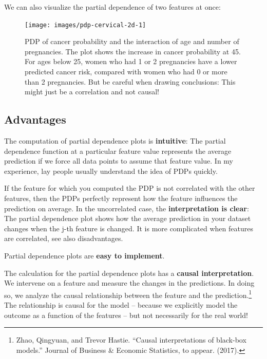 \documentclass[
  12pt,
]{krantz}
\begin{document}
We can also visualize the partial dependence of two features at once:

\begin{figure}

{\centering \texttt{[image: images/pdp-cervical-2d-1]} 

}

\caption{PDP of cancer probability and the interaction of age and number of pregnancies. The plot shows the increase in cancer probability at 45. For ages below 25, women who had 1 or 2 pregnancies have a lower predicted cancer risk, compared with women who had 0 or more than 2 pregnancies. But be careful when drawing conclusions: This might just be a correlation and not causal!}\label{fig:pdp-cervical-2d}
\end{figure}

\hypertarget{advantages-5}{%
\subsection{Advantages}\label{advantages-5}}

The computation of partial dependence plots is \textbf{intuitive}:
The partial dependence function at a particular feature value represents the average prediction if we force all data points to assume that feature value.
In my experience, lay people usually understand the idea of PDPs quickly.

If the feature for which you computed the PDP is not correlated with the other features, then the PDPs perfectly represent how the feature influences the prediction on average.
In the uncorrelated case, the \textbf{interpretation is clear}:
The partial dependence plot shows how the average prediction in your dataset changes when the j-th feature is changed.
It is more complicated when features are correlated, see also disadvantages.

Partial dependence plots are \textbf{easy to implement}.

The calculation for the partial dependence plots has a \textbf{causal interpretation}.
We intervene on a feature and measure the changes in the predictions.
In doing so, we analyze the causal relationship between the feature and the prediction.\footnote{Zhao, Qingyuan, and Trevor Hastie. ``Causal interpretations of black-box models.'' Journal of Business \& Economic Statistics, to appear. (2017).}
The relationship is causal for the model -- because we explicitly model the outcome as a function of the features -- but not necessarily for the real world!
\end{document}
